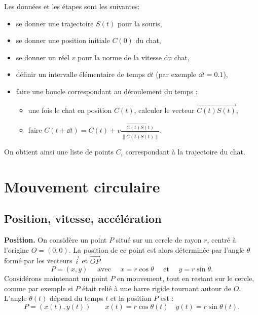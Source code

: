\documentclass[11pt,class=report,crop=false]{standalone}
\begin{document}
Les données et les étapes sont les suivantes:
\begin{itemize}
	\item se donner une trajectoire $S(t)$ pour la souris,
	\item se donner une position initiale $C(0)$ du chat, 
	\item se donner un réel $v$ pour la norme de la vitesse du chat,
	\item définir un intervalle élémentaire de temps $\dd t$ (par exemple $\dd t = 0.1$),
	
	\item faire une boucle correspondant au déroulement du temps :
	\begin{itemize}
		\item une fois le chat en position $C(t)$, calculer le vecteur
		$\vec{C(t)S(t)}$,
		\item faire $C(t + \dd t) = C(t) + v \frac{\vec{C(t)S(t)}}{\| \vec{C(t)S(t)} \|}$.
	\end{itemize}
\end{itemize}
On obtient ainsi une liste de points $C_i$ correspondant à la trajectoire du chat.




\section{Mouvement circulaire}

\subsection{Position, vitesse, accélération}

\textbf{Position.}
On considère un point $P$ situé sur un cercle de rayon $r$, centré à l'origine $O = (0,0)$. La position de ce point est alors déterminée par l'angle $\theta$ formé par les vecteurs $\vec{i}$ et $\vec{OP}$.
$$P = (x,y) \quad \text{ avec } \quad  x = r \cos\theta \quad\text{ et }\quad y = r \sin\theta.$$
Considérons maintenant un point $P$ en mouvement, tout en restant sur le cercle, comme par exemple si $P$ était relié à une barre rigide tournant autour de $O$.
L'angle $\theta(t)$ dépend du temps $t$ et la position $P$ est : 
$$P = (x(t),y(t)) \qquad x(t) = r \cos\theta(t) \quad y(t) = r \sin\theta(t).$$
\end{document}
